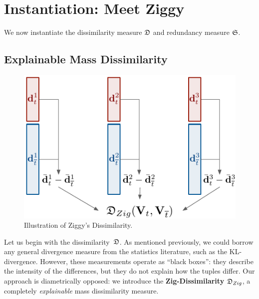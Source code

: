 \section{Instantiation: Meet Ziggy}
\label{sec:instantiation}
We now instantiate the dissimilarity measure $\mathfrak{D}$ and redundancy measure
$\mathfrak{S}$. 

\subsection{Explainable Mass Dissimilarity}
\label{sec:explain}
\begin{figure}
  \centering
  \includegraphics[width=0.7\columnwidth]{Figures/Zig-Dissim}
  \caption{Illustration of Ziggy's Dissimilarity.}
  \label{pic:zigdis}
\end{figure}

Let us begin with the dissimilarity~$\mathfrak{D}$. As mentioned previously, we could
borrow any general divergence measure from the statistics literature, such as
the KL-divergence. However, these measurements operate as ``black boxes'': they
describe the intensity of the differences, but they do not explain how the
tuples differ. Our approach is diametrically opposed: we introduce the
\textbf{Zig-Dissimilarity} $\mathfrak{D}_{Zig}$, a completely \emph{explainable}
mass dissimilarity measure.

